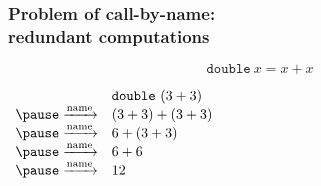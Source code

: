 \documentclass[professionalfont,dvipdfmx,cjk,xcolor=dvipsnames,envcountsect,notheorems,12pt]{beamer}
\theoremstyle{definition}
\newcommand{\CALLBYNAME}{\xrightarrow{\mathrm{name}}}
\begin{document}
\begin{frame}
	\frametitle{Problem of call-by-name:\\redundant computations}
	\Large
	\[\mathtt{double}~x=x+x\]
	\begin{center}
		\begin{minipage}{.6\linewidth}
			\begin{block}{}
				$\begin{array}{ll}
					& \mathtt{double}~(3+3) \\
					\pause
					\CALLBYNAME & (3+3)+(3+3) \\
					\pause
					\CALLBYNAME & 6+(3+3) \\
					\pause
					\CALLBYNAME & 6+6 \\
					\pause
					\CALLBYNAME & 12
				\end{array}$
			\end{block}
		\end{minipage}
	\end{center}
\end{frame}
\end{document}
